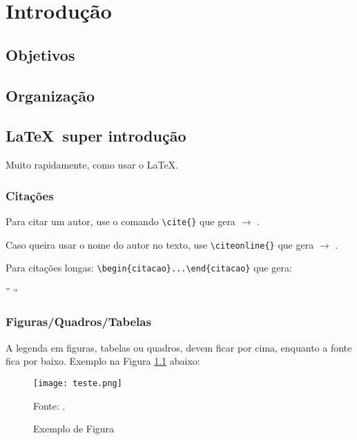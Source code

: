 \chapter{Introdução}
\Blindtext

\section{Objetivos}

\section{Organização}%

\section{\LaTeX ~super introdução}
Muito rapidamente, como usar o \LaTeX.

\subsection{Citações}
Para citar um autor, use o comando \verb|\cite{}| que gera $\rightarrow$ \cite{biswal1995}. 

Caso queira usar o nome do autor no texto, use \verb|\citeonline{}| que gera $\rightarrow$ .

Para citações longas: \verb|\begin{citacao}...\end{citacao}| que gera:

\begin{citacao}
	'' \blindtext ``
\end{citacao}

\subsection{Figuras/Quadros/Tabelas}
A legenda em figuras, tabelas ou quadros, devem ficar por cima, enquanto a fonte fica por baixo. Exemplo na Figura \ref{f:ref-cruzada} abaixo:

\begin{figure}[H] 
	\centering %
	\caption{Exemplo de Figura}
	\texttt{[image: teste.png]}
	
	Fonte: \cite{Raichle2011}.
	\label{f:ref-cruzada}
\end{figure}